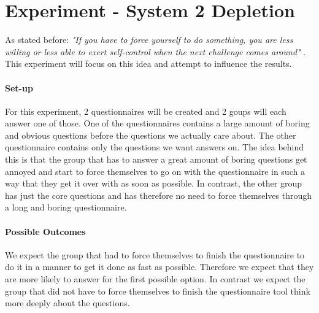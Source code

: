 

\section{Experiment - System 2 Depletion}
As stated before:\emph{ "If you have to force yourself to do something, you are less willing or less able to exert self-control when the next challenge comes around" }.
This experiment will focus on this idea and attempt to influence the results.

\paragraph{Set-up}
For this experiment, 2 questionnaires will be created and 2 goups will each answer one of those. One of the questionnaires contains a large amount of boring and obvious questions before the questions we actually care about. The other questionnaire contains only the questions we want answers on. The idea behind this is that the group that has to answer a great amount of boring questions get annoyed and start to force themselves to go on with the questionnaire in such a way that they get it over with as soon as possible. In contrast, the other group has just the core questions and has therefore no need to force themselves through a long and boring questionnaire.

\paragraph{Possible Outcomes} %
We expect the group that had to force themselves to finish the questionnaire to do it in a manner to get it done as fast as possible. Therefore we expect that they are more likely to answer for the first possible option. In contrast we expect the group that did not have to force themselves to finish the questionnaire  tool think more deeply about the questions.



